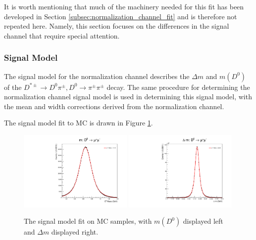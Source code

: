 It is worth mentioning that much of the machinery needed for this fit has been developed in Section \ref{subsec:normalization_channel_fit} and is therefore not repeated here. Namely, this section focuses on the differences in the signal channel that require special attention.

\subsubsection{Signal Model}

The signal model for the normalization channel describes the $\Delta m$ and $m(D^0)$ of the $D^{*\pm}\to D^0 \pi^\pm, D^0 \to \pi^\pm \pi^\pm$ decay. The same procedure for determining the normalization channel signal model is used in determining this signal model, with the mean and width corrections derived from the normalization channel.

The signal model fit to MC is drawn in Figure \ref{fig:d0mumu_uml_fit}.

\begin{figure}[htp]
    \begin{center}
      \includegraphics[width=0.49\textwidth]{figures/chapter4/signal_fit/d0mm_2022_2023_0_m.pdf}
      \includegraphics[width=0.49\textwidth]{figures/chapter4/signal_fit/d0mm_2022_2023_0_dm.pdf}\\
    \end{center}
    \caption{
      The signal model fit on MC samples, with $m(D^0)$ displayed left and $\Delta m$ displayed right.
    }
    \label{fig:d0mumu_uml_fit}
\end{figure}

